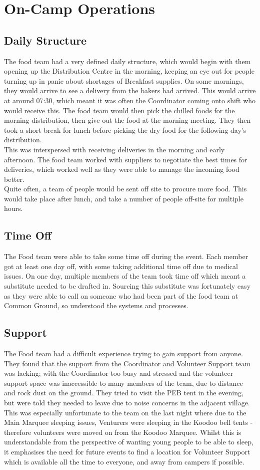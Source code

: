 \section{On-Camp Operations}
\subsection{Daily Structure}
The food team had a very defined daily structure, which would begin with them opening up the Distribution Centre in the morning, keeping an eye out for people turning up in panic about shortages of Breakfast supplies. On some mornings, they would arrive to see a delivery from the bakers had arrived. This would arrive at around 07:30, which meant it was often the Coordinator coming onto shift who would receive this. The food team would then pick the chilled foods for the morning distribution, then give out the food at the morning meeting. They then took a short break for lunch before picking the dry food for the following day's distribution.\\

This was interspersed with receiving deliveries in the morning and early afternoon. The food team worked with suppliers to negotiate the best times for deliveries, which worked well as they were able to manage the incoming food better. \\

Quite often, a team of people would be sent off site to procure more food. This would take place after lunch, and take a number of people off-site for multiple hours. 
\subsection{Time Off}
The Food team were able to take some time off during the event. Each member got at least one day off, with some taking additional time off due to medical issues. On one day, multiple members of the team took time off which meant a substitute needed to be drafted in. Sourcing this substitute was fortunately easy as they were able to call on someone who had been part of the food team at Common Ground, so understood the systems and processes. 
\subsection{Support}
The Food team had a difficult experience trying to gain support from anyone. They found that the support from the Coordinator and Volunteer Support team was lacking; with the Coordinator too busy and stressed and the volunteer support space was inaccessible to many members of the team, due to distance and rock dust on the ground. They tried to visit the PEB tent in the evening, but were told they needed to leave due to noise concerns in the adjacent village. This was especially unfortunate to the team on the last night where due to the Main Marquee sleeping issues, Venturers were sleeping in the Koodoo bell tents - therefore volunteers were moved on from the Koodoo Marquee. Whilst this is understandable from the perspective of wanting young people to be able to sleep, it emphasises the need for future events to find a location for Volunteer Support which is available all the time to everyone, and away from campers if possible. 

